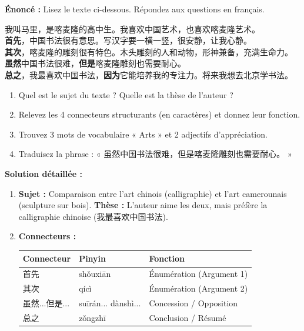 \documentclass[11pt]{article}
\begin{document}
\begin{exoresolu}
\textbf{Énoncé :} Lisez le texte ci-dessous. Répondez aux questions en français.
\begin{textebox}
我叫马里，是喀麦隆的高中生。我喜欢中国艺术，也喜欢喀麦隆艺术。\\
\textbf{首先}，中国书法很有意思。写汉字要一横一竖，很安静，让我心静。\\
\textbf{其次}，喀麦隆的雕刻很有特色。木头雕刻的人和动物，形神兼备，充满生命力。\\
\textbf{虽然}中国书法很难，\textbf{但是}喀麦隆雕刻也需要耐心。\\
\textbf{总之}，我最喜欢中国书法，\textbf{因为}它能培养我的专注力。将来我想去北京学书法。
\end{textebox}
\begin{enumerate}
    \item Quel est le sujet du texte ? Quelle est la thèse de l'auteur ?
    \item Relevez les 4 connecteurs structurants (en caractères) et donnez leur fonction.
    \item Trouvez 3 mots de vocabulaire « Arts » et 2 adjectifs d'appréciation.
    \item Traduisez la phrase : « 虽然中国书法很难，但是喀麦隆雕刻也需要耐心。 »
\end{enumerate}
\tcblower
\textbf{Solution détaillée :}
\begin{enumerate}
    \item \textbf{Sujet :} Comparaison entre l'art chinois (calligraphie) et l'art camerounais (sculpture sur bois). \textbf{Thèse :} L'auteur aime les deux, mais préfère la calligraphie chinoise (我最喜欢中国书法).
    \item \textbf{Connecteurs :}
    \begin{center}
    \begin{tabularx}{\linewidth}{|X|X|X|}
    \hline \rowcolor{popblueL} Connecteur & Pinyin & Fonction \\ \hline
    首先 & shǒuxiān & Énumération (Argument 1) \\ \hline
    其次 & qícì & Énumération (Argument 2) \\ \hline
    虽然...但是... & suīrán... dànshì... & Concession / Opposition \\ \hline
    总之 & zǒngzhī & Conclusion / Résumé \\ \hline
    \end{tabularx}

\end{center}
\end{enumerate}
\end{exoresolu}
\end{document}
